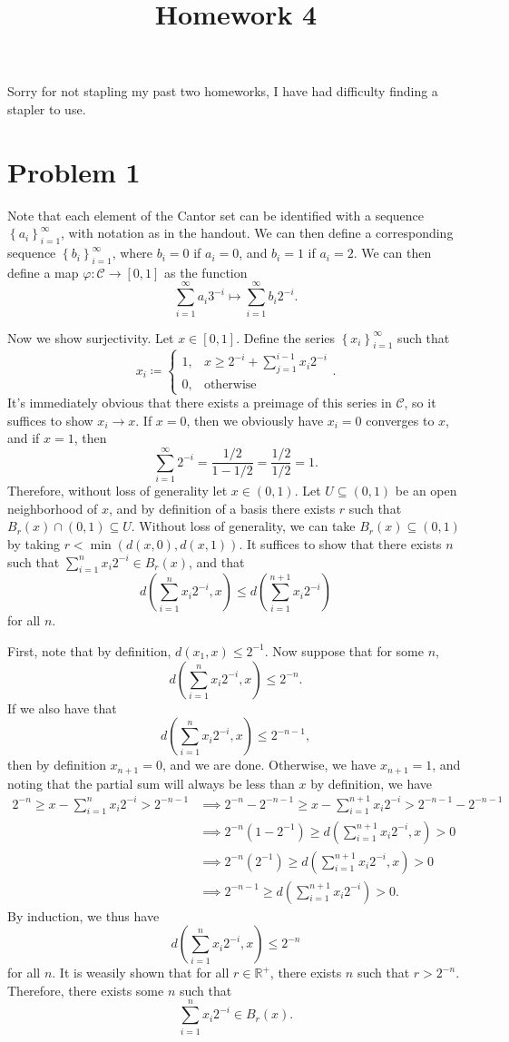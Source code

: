 \documentclass[11pt, letterpaper]{article}
\title{Homework 4}
\begin{document}
\makeproblem
Sorry for not stapling my past two homeworks, I have had difficulty finding a stapler to use.
\section*{Problem 1}
Note that each element of the Cantor set can be identified with a sequence $\left\{ a_i \right\}_{i=1} ^\infty $, with notation as in the handout. We can then define a corresponding sequence $\left\{ b_i \right\}_{i=1} ^{\infty } $, where $b_i=0$ if $a_i=0$, and $b_i=1$ if $a_i=2$. We can then define a map $\varphi : \mathcal{C}  \to [0,1]$ as the function
\[
	\sum_{i=1}^{\infty} a_i3^{-i} \mapsto \sum_{i=1}^{\infty} b_i2^{-i} 
.\]

Now we show surjectivity. Let $x\in [0,1]$. Define the series $\left\{ x_i \right\}_{i=1} ^{\infty } $ such that
\[
	x_{i} \coloneqq 
	\begin{cases}
		1,&x\geq 2^{-i} +\sum_{j=1}^{i-1} x_i2^{-i} \\
		0,&\text{otherwise} 
	\end{cases}
.\]
It's immediately obvious that there exists a preimage of this series in $\mathcal{C} $, so it suffices to show $x_i\to x$. If $x=0$, then we obviously have $x_i=0$ converges to $x$, and if $x=1$, then
\[
	\sum_{i=1}^{\infty} 2^{-i} =\frac{1/2}{1-1/2} =\frac{1/2}{1/2} =1
.\]
Therefore, without loss of generality let $x\in (0,1)$. Let $U\subseteq (0,1)$ be an open neighborhood of $x$, and by definition of a basis there exists $r$ such that $B_r(x)\cap (0,1)\subseteq U$. Without loss of generality, we can take $B_r(x)\subseteq (0,1)$ by taking $r<\min (d(x,0),d(x,1))$. It suffices to show that there exists $n$ such that $\sum_{i=1}^{n} x_i2^{-i}\in B_r(x)$, and that
\[
	d\left( \sum_{i=1}^{n} x_i2^{-i} ,x \right) \leq d\left( \sum_{i=1}^{n+1} x_i2^{-i}  \right) 
\]
for all $n$.

First, note that by definition, $d(x_1,x)\leq 2^{-1} $. Now suppose that for some $n$,
\[
	d\left( \sum_{i=1}^{n} x_i2^{-i},x \right) \leq 2^{-n} 
.\]
If we also have that
\[
	d\left( \sum_{i=1}^{n} x_i2^{-i} ,x \right) \leq 2^{-n-1} ,
\]
then by definition $x_{n+1} =0$, and we are done. Otherwise, we have $x_{n+1} =1$, and noting that the partial sum will always be less than $x$ by definition, we have
\begin{align*}
	2^{-n}\geq  x-\sum_{i=1}^{n} x_i2^{-i} > 2^{-n-1} &\implies 2^{-n} -2^{-n-1} \geq x-\sum_{i=1}^{n+1} x_i2^{-i} >2^{-n-1} -2^{-n-1} \\
							  &\implies 2^{-n} \left( 1-2^{-1}  \right) \geq d\left( \sum_{i=1}^{n+1} x_i2^{-i} ,x \right)  >0\\
							  &\implies 2^{-n} \left( 2^{-1}  \right) \geq d\left( \sum_{i=1}^{n+1} x_i2^{-i} ,x \right) >0\\
							  &\implies 2^{-n-1} \geq d\left( \sum_{i=1}^{n+1} x_i2^{-i}  \right) >0
.\end{align*}
By induction, we thus have
\[	d\left( \sum_{i=1}^{n} x_i2^{-i} ,x \right) \leq 2^{-n} 
\]
for all $n$. It is weasily shown that for all $r\in\mathbb{R} ^+$, there exists $n$ such that $r>2^{-n} $. Therefore, there exists some $n$ such that
\[
	\sum_{i=1}^{n} x_i2^{-i} \in B_r(x)
.\]
\end{document}
